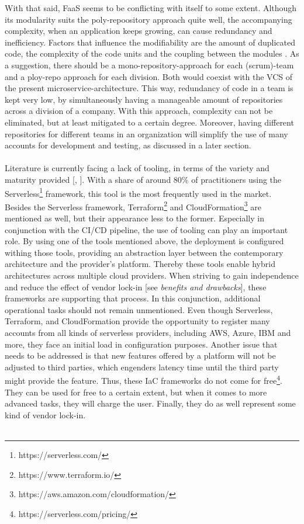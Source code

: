 \documentclass[11pt]{article}
\begin{document}
With that said, FaaS seems to be conflicting with itself to some extent. Although its modularity suits the poly-repoository approach quite well, the accompanying complexity, when an application keeps growing, can cause redundancy and inefficiency. Factors that inﬂuence the modiﬁability are the amount of duplicated code, the complexity of the code units and the coupling between the modules \cite{racicot2019quality}. As a suggestion, there should be a mono-repository-approach for each (scrum)-team and a ploy-repo approach for each division. Both would coexist with the VCS of the present microservice-architecture. This way, redundancy of code in a team is kept very low, by simultaneously having a manageable amount of repositories across a division of a company. With this approach, complexity can not be eliminated, but at least mitigated to a certain degree. Moreover, having different repositories for different teams in an organization will simplify the use of many accounts for development and testing, as discussed in a later section. \\\\
Literature is currently facing a lack of tooling, in terms of the variety and maturity provided [\cite{Yussupov2019_SystematicMappingStudyFaaS}, \cite{leitner2019mixed}]. With a share of around 80\% \cite{leitner2019mixed} of practitioners using the Serverless\footnote{https://serverless.com/} framework, this tool is the most frequently used in the market. Besides the Serverless framework, Terraform\footnote{https://www.terraform.io/} and CloudFormation\footnote{https://aws.amazon.com/cloudformation/} are mentioned as well, but their appearance less to the former. Especially in conjunction with the CI/CD pipeline, the use of tooling can play an important role. By using one of the tools mentioned above, the deployment is configured withing those tools, providing an abstraction layer between the contemporary architecture and the provider's platform. Thereby these tools enable hybrid architectures across multiple cloud providers. When striving to gain independence and reduce the effect of vendor lock-in [see \textit{benefits and drawbacks}], these frameworks are supporting that process. In this conjunction, additional operational tasks should not remain unmentioned. Even though Serverless, Terraform, and CloudFormation provide the opportunity to register many accounts from all kinds of serverless providers, including AWS, Azure, IBM and more, they face an initial load in configuration purposes. Another issue that needs to be addressed is that new features offered by a platform will not be adjusted to third parties, which engenders latency time until the third party might provide the feature. Thus, these IaC frameworks do not come for free\footnote{https://serverless.com/pricing/}. They can be used for free to a certain extent, but when it comes to more advanced tasks, they will charge the user. Finally, they do as well represent some kind of vendor lock-in.\\\\
\end{document}
